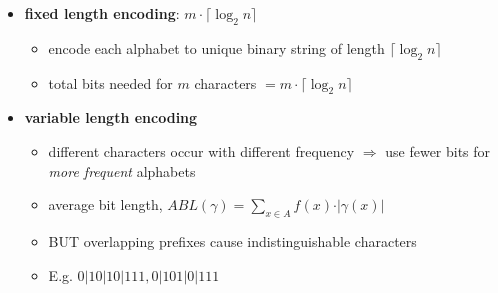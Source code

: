 \documentclass[10pt, landscape]{article}
\begin{document}
\begin{multicols*}{4}
  \begin{itemize}
    \item \textbf{fixed length encoding}: $m \cdot \lceil \log_2 n \rceil $
      \begin{itemize}
        \item encode each alphabet to unique binary string of length $ \lceil \log_2 n \rceil  $
        \item total bits needed for $m$ characters $= m \cdot \lceil \log_2 n \rceil $
      \end{itemize}
    \item \textbf{variable length encoding}
      \begin{itemize}
        \item different characters occur with different frequency $\Rightarrow$ use fewer bits for \textit{more frequent} alphabets
        \item average bit length,  $ABL(\gamma) = \sum\limits_{x \in A} f(x) \cdot \vert \gamma(x) \vert$
        \item BUT overlapping prefixes cause indistinguishable characters
        \item E.g. $0|10|10|111, 0|101|0|111$
      \end{itemize}
  \end{itemize}


\end{multicols*}
\end{document}

